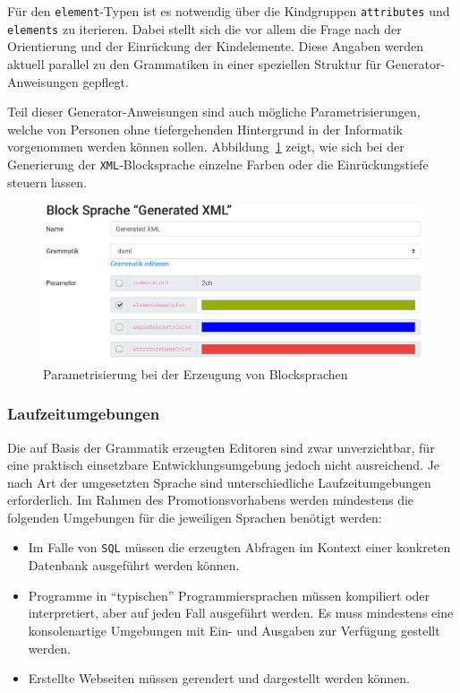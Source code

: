 \documentclass[paper=a4,fontsize=11pt,parskip=half]{scrartcl}
\begin{document}
Für den \texttt{element}-Typen ist es notwendig über die Kindgruppen \texttt{attributes} und \texttt{elements} zu iterieren. Dabei stellt sich die vor allem die Frage nach der Orientierung und der Einrückung der Kindelemente. Diese Angaben werden aktuell parallel zu den Grammatiken in einer speziellen Struktur für Generator-Anweisungen gepflegt.

Teil dieser Generator-Anweisungen sind auch mögliche Parametrisierungen, welche von Personen ohne tiefergehenden Hintergrund in der Informatik vorgenommen werden können sollen. Abbildung~\ref{fig:block-lang-generation-parameters} zeigt, wie sich bei der Generierung der \texttt{XML}-Blocksprache einzelne Farben oder die Einrückungstiefe steuern lassen.

\begin{figure}[p]
  \centering\includegraphics[width=\linewidth]{screenshot-generation-parameters.png}
  \caption{Parametrisierung bei der Erzeugung von Blocksprachen}
  \label{fig:block-lang-generation-parameters}
\end{figure}

\subsubsection{Laufzeitumgebungen}

Die auf Basis der Grammatik erzeugten Editoren sind zwar unverzichtbar, für eine praktisch einsetzbare Entwicklungsumgebung jedoch nicht ausreichend. Je nach Art der umgesetzten Sprache sind unterschiedliche Laufzeitumgebungen erforderlich. Im Rahmen des Promotionsvorhabens werden mindestens die folgenden Umgebungen für die jeweiligen Sprachen benötigt werden:

\begin{itemize}
\item Im Falle von \texttt{SQL} müssen die erzeugten Abfragen im Kontext einer konkreten Datenbank ausgeführt werden können.
\item Programme in \enquote{typischen} Programmiersprachen müssen kompiliert oder interpretiert, aber auf jeden Fall ausgeführt werden. Es muss mindestens eine konsolenartige Umgebungen mit Ein- und Ausgaben zur Verfügung gestellt werden.
\item Erstellte Webseiten müssen gerendert und dargestellt werden können.
\end{itemize}
\end{document}
